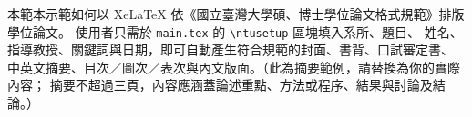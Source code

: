 \begin{abstractCH}
本範本示範如何以 XeLaTeX 依《國立臺灣大學碩、博士學位論文格式規範》排版學位論文。
使用者只需於 \texttt{main.tex} 的 \texttt{\textbackslash ntusetup} 區塊填入系所、題目、
姓名、指導教授、關鍵詞與日期，即可自動產生符合規範的封面、書背、口試審定書、
中英文摘要、目次／圖次／表次與內文版面。（此為摘要範例，請替換為你的實際內容；
摘要不超過三頁，內容應涵蓋論述重點、方法或程序、結果與討論及結論。）
\end{abstractCH}
